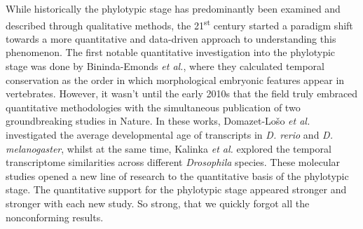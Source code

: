 While historically the phylotypic stage has predominantly been examined and described through qualitative methods, the 21\textsuperscript{st} century started a paradigm shift towards a more quantitative and data-driven approach to understanding this phenomenon\cite{Chan2021}. The first notable quantitative investigation into the phylotypic stage was done by Bininda-Emonds \textit{et al.}, where they calculated temporal conservation as the order in which morphological embryonic features appear in vertebrates\cite{OlafRP2003}. However, it wasn't until the early 2010s that the field truly embraced quantitative methodologies with the simultaneous publication of two groundbreaking studies in Nature\cite{Kalinka2010, DomazetLoso2010}. In these works, Domazet-Lošo \textit{et al.} investigated the average developmental age of transcripts in \textit{D. rerio} and \textit{D. melanogaster}, whilst at the same time, Kalinka \textit{et al.} explored the temporal transcriptome similarities across different \textit{Drosophila} species. These molecular studies opened a new line of research to the quantitative basis of the phylotypic stage. The quantitative support for the phylotypic stage appeared stronger and stronger with each new study. So strong, that we quickly forgot all the nonconforming results.

